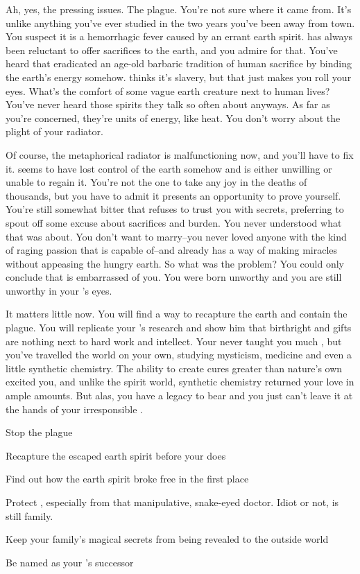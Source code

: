 \documentclass[char]{Pestilence}
\begin{document}
Ah, yes, the pressing issues. The plague. You're not sure where it came from. It's unlike anything you've ever studied in the two years you've been away from town. You suspect it is a hemorrhagic fever caused by an errant earth spirit. \cElder{\Parent} has always been reluctant to offer sacrifices to the earth, and you admire \cElder{\them} for that. You've heard that \cElder{\they} eradicated an age-old barbaric tradition of human sacrifice by binding the earth's energy somehow. \cRebel{} thinks it's slavery, but that just makes you roll your eyes. What's the comfort of some vague earth creature next to human lives? You've never heard those spirits they talk so often about anyways. As far as you're concerned, they're units of energy, like heat. You don't worry about the plight of your radiator. 

Of course, the metaphorical radiator is malfunctioning now, and you'll have to fix it. \cElder{\Parent} seems to have lost control of the earth somehow and is either unwilling or unable to regain it. You're not the one to take any joy in the deaths of thousands, but you have to admit it presents an opportunity to prove yourself. You're still somewhat bitter that \cElder{\Parent} refuses to trust you with \cElder{\their} secrets, preferring to spout off some excuse about sacrifices and burden. You never understood what that was about. You don't want to marry--you never loved anyone with the kind of raging passion that \cRebel{} is capable of--and \cElder{\Parent} already has a way of making miracles without appeasing the hungry earth. So what was the problem? You could only conclude that \cElder{\Parent} is embarrassed of you. You were born unworthy and you are still unworthy in your \cElder{\parent}'s eyes.

It matters little now. You will find a way to recapture the earth and contain the plague. You will replicate your \cElder{\parent}'s research and show him that birthright and gifts are nothing next to hard work and intellect. Your \cElder{\parent} never taught you much \cElder{\themself}, but you've travelled the world on your own, studying mysticism, medicine and even a little synthetic chemistry. The ability to create cures greater than nature's own excited you, and unlike the spirit world, synthetic chemistry returned your love in ample amounts. But alas, you have a legacy to bear and you just can't leave it at the hands of your irresponsible \cRebel{\sibling}.

\begin{itemz}[Goals]
	\item Stop the plague
	\item Recapture the escaped earth spirit before your \cElder{\parent} does
	\item Find out how the earth spirit broke free in the first place
	\item Protect \cRebel{}, especially from that manipulative, snake-eyed doctor. Idiot or not, \cRebel{} is still family.
	\item Keep your family's magical secrets from being revealed to the outside world
	\item Be named as your \cElder{\parent}'s successor
\end{itemz}
\end{document}
